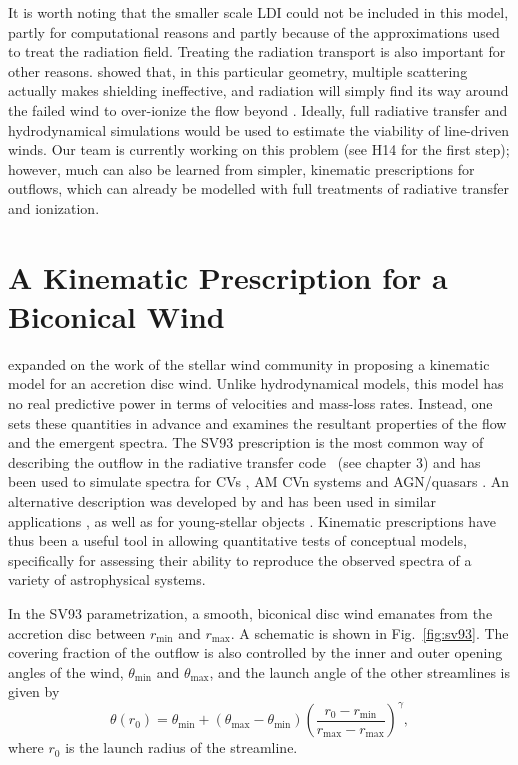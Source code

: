 It is worth noting that the smaller scale LDI could not be included in this model,
partly for computational reasons and partly because of the approximations 
used to treat the radiation field. Treating the radiation transport is also
important for other reasons. 
\citet[][hereafter H14]{H14} showed that, in this particular geometry, 
multiple scattering actually makes shielding
ineffective, and radiation will simply find its way around the failed wind
to over-ionize the flow beyond \citep[see also][]{sim2010_hydro}.
Ideally, full radiative transfer and hydrodynamical simulations would be used
to estimate the viability of line-driven winds. Our team is currently working 
on this problem (see H14 for the first step); however, much 
can also be learned from simpler, kinematic prescriptions for outflows, which can
already be modelled with full treatments of radiative transfer and ionization.  

\section{A Kinematic Prescription for a Biconical Wind}
\label{sec:sv93_model}

\citet[][hereafter SV93]{SV93}  
expanded on the work of the stellar wind community \citep[e.g.][]{AL85} 
in proposing a kinematic model for an accretion disc wind. Unlike 
hydrodynamical models, this model has no real predictive power in terms of velocities
and mass-loss rates. Instead, one sets these quantities in advance and examines the 
resultant properties of the flow and the emergent spectra. The SV93 prescription
is the most common way of describing the outflow in the 
radiative transfer code \py\ (see chapter 3)
and has been used to simulate spectra for CVs \citep[][chapter 4]{LK02, M15}, 
AM CVn systems \citep{kusterer2014} and AGN/quasars 
\citep[][chapter 5]{higginbottom2013, M16, yong2016}. 
An alternative description was developed by \cite{KWD95} and has been used
in similar applications \citep{LK02, simlong2008, sim2010}, as 
well as for young-stellar objects \citep[YSOs;][]{simmacro2005}.
Kinematic prescriptions have thus been a useful tool in allowing quantitative
tests of conceptual models, specifically for assessing their ability to reproduce
the observed spectra of a variety of astrophysical systems.

In the SV93 parametrization,
a smooth, biconical disc wind emanates from the accretion disc between 
$r_{\mathrm{\mathrm{min}}}$ and $r_{\mathrm{\mathrm{max}}}$. A schematic is shown in Fig.~\ref{fig:sv93}.
The covering fraction of the outflow is 
also controlled by the inner and outer opening angles of the wind, $\theta_{\mathrm{min}}$ and
$\theta_{\mathrm{max}}$, and the launch angle of the other streamlines is given by 
\begin{equation}
\theta(r_0) = \theta_{\mathrm{min}} + (\theta_{\mathrm{max}} - \theta_{\mathrm{min}}) \left(\frac{r_0 - r_{\mathrm{min}}}{r_{\mathrm{max}} - r_{\mathrm{max}}} \right)^{\gamma},
\label{eq:wind_theta}
\end{equation}
where $r_0$ is the launch radius of the streamline.

